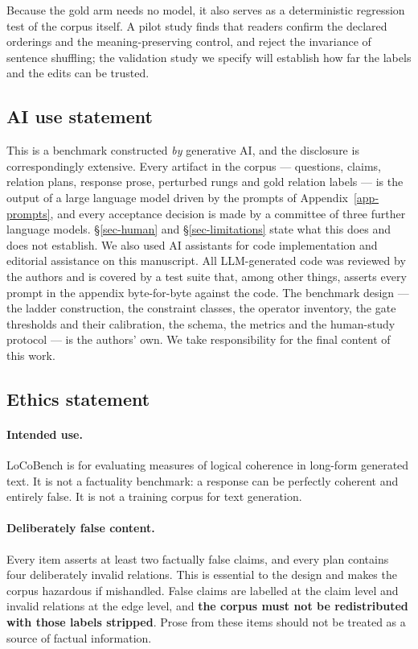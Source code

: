 Because the gold arm needs no model, it also serves as a deterministic regression test of the corpus itself. A pilot study finds that readers
confirm the declared orderings and the meaning-preserving control, and reject the invariance of sentence shuffling; the
validation study we specify will establish how far the labels and the edits can be trusted.

\subsection*{AI use statement}

This is a benchmark constructed \emph{by} generative AI, and the disclosure is correspondingly extensive. Every
artifact in the corpus --- questions, claims, relation plans, response prose, perturbed rungs and gold relation labels ---
is the output of a large language model driven by the prompts of Appendix~\ref{app-prompts}, and every acceptance
decision is made by a committee of three further language models. \S\ref{sec-human} and \S\ref{sec-limitations} state
what this does and does not establish. We also used AI assistants for code implementation and editorial assistance on
this manuscript. All LLM-generated code was reviewed by the authors and is covered by a test suite that, among other
things, asserts every prompt in the appendix byte-for-byte against the code. The benchmark design --- the ladder
construction, the constraint classes, the operator inventory, the gate thresholds and their calibration, the schema, the
metrics and the human-study protocol --- is the authors' own. We take responsibility for the final content of this work.

\subsection*{Ethics statement}

\paragraph{Intended use.} LoCoBench is for evaluating measures of logical coherence in long-form generated text. It is
not a factuality benchmark: a response can be perfectly coherent and entirely false. It is not a training corpus for
text generation.

\paragraph{Deliberately false content.} Every item asserts at least two factually false claims, and every plan contains
four deliberately invalid relations. This is essential to the design and makes the corpus hazardous if mishandled. False
claims are labelled at the claim level and invalid relations at the edge level, and \textbf{the corpus must not be
redistributed with those labels stripped}. Prose from these items should not be treated as a source of factual
information.

